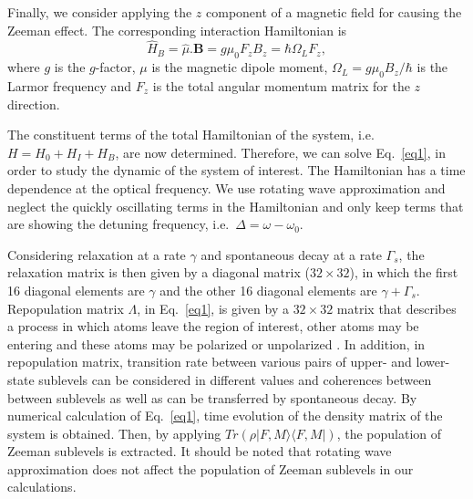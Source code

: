 \documentclass[a4paper]{article}
\begin{document}
Finally, we consider applying the $z$ component of a magnetic field for causing the Zeeman effect. The corresponding interaction Hamiltonian is
\begin{equation}
\hat{H}_B=\hat \mu .\textbf{B}=g\mu_0F_z B_z=\hbar\Omega_L F_z,
\end{equation}
where $g$ is  the $g$-factor, $\mu$ is the magnetic dipole moment, $\Omega_L=g\mu_0 B_z/ \hbar $  is the Larmor frequency and $F_z$ is the total angular momentum matrix for the $z$ direction. 

The constituent terms of the total Hamiltonian of the system, i.e.~$H=H_0+H_I+H_B$, are now determined. Therefore, we can solve Eq.~\ref{eq1}, in order to study the dynamic of the system of interest. The Hamiltonian has a time dependence at the optical frequency. We use rotating wave approximation and neglect the quickly oscillating terms in the Hamiltonian and only keep terms that are showing the detuning frequency, i.e.~$\Delta =\omega-\omega_0 $. 
 
Considering relaxation at a rate $\gamma$ and spontaneous decay at a rate $\Gamma_s$,  the relaxation matrix is then given by a diagonal matrix ($32\times 32$), in which the first 16 diagonal elements are $\gamma$ and the other 16 diagonal elements are $\gamma +\Gamma_s$. Repopulation matrix $\Lambda$, in Eq.~\ref{eq1}, is given by a $32\times 32$ matrix that describes  a process in which atoms leave the region of interest, other
atoms may be entering and these atoms may be polarized or
unpolarized  .  In addition, in repopulation matrix, transition rate between various pairs of upper- and lower-state sublevels can be  considered in  different values and coherences between between sublevels as well as  can be transferred by spontaneous decay. By numerical calculation of Eq.~\ref{eq1}, time evolution of the density matrix of the system is obtained. Then, by applying 
$Tr(\rho |F,M\rangle\langle F,M|)$, the population of Zeeman sublevels is extracted. It should be noted that rotating wave approximation does not affect the population of Zeeman sublevels in our calculations.
\end{document}
